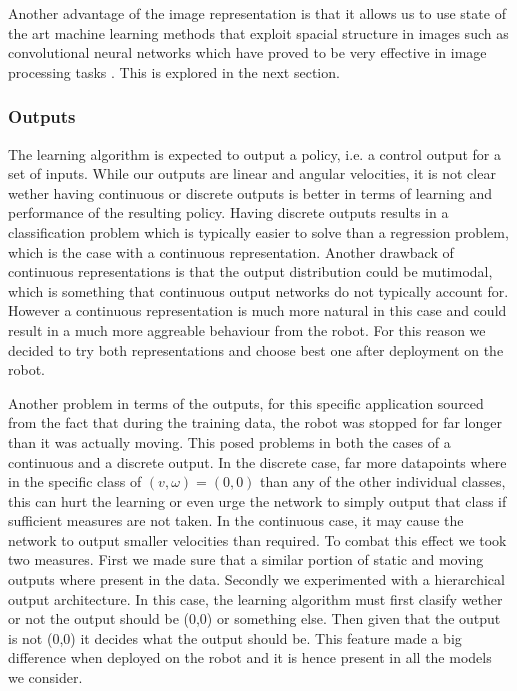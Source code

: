 \documentclass[a4paper,11pt]{report}
\begin{document}
Another advantage of the image representation is that it allows us to use state of the art machine learning methods that exploit spacial structure in images such as convolutional neural networks which have proved to be very effective in image processing tasks \cite{krizhevsky2012imagenet}. This is explored in the next section.

\subsubsection{Outputs}
The learning algorithm is expected to output a policy, i.e. a control output for a set of inputs. While our outputs are linear and angular velocities, it is not clear wether having continuous or discrete outputs is better in terms of learning and performance of the resulting policy. Having discrete outputs results in a classification problem which is typically easier to solve than a regression problem, which is the case with a continuous representation. Another drawback of continuous representations is that the output distribution could be mutimodal, which is something that continuous output networks do not typically account for. However a continuous representation is much more natural in this case and could result in a much more aggreable behaviour from the robot. For this reason we decided to try both representations and choose best one after deployment on the robot. 

Another problem in terms of the outputs, for this specific application sourced from the fact that during the training data, the robot was stopped for far longer than it was actually moving. This posed problems in both the cases of a continuous and a discrete output. In the discrete case, far more datapoints where in the specific class of $(v,\omega) = (0,0)$ than any of the other individual classes, this can hurt the learning or even urge the network to simply output that class if sufficient measures are not taken. In the continuous case, it may cause the network to output smaller velocities than required. To combat this effect we took two measures. First we made sure that a similar portion of static and moving outputs where present in the data. Secondly we experimented with a hierarchical output architecture. In this case, the learning algorithm must first clasify wether or not the output should be (0,0) or something else. Then given that the output is not (0,0) it decides what the output should be. This feature made a big difference when deployed on the robot and it is hence present in all the models we consider.
\end{document}
